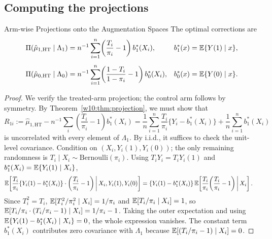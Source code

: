 \documentclass[master.tex]{subfiles}
\begin{document}
\subsection{Computing the projections}
\label{w10:subsec:proj-compute}

\begin{thm}{Arm-wise Projections onto the Augmentation Spaces}
\label{w10:thm:proj-causal}
The optimal corrections are
\begin{align}
  \Pi(\hat\mu_{1,\mathrm{HT}} \mid \Lambda_1)
  &= n^{-1}\sum_{i=1}^n
     \!\left(\frac{T_i}{\pi_i}-1\right) b_1^*(X_i),
  &b_1^*(x) &= \mathbb{E}\{Y(1)\mid x\},
  \label{w10:eq:proj-causal-1} \\[4pt]
  \Pi(\hat\mu_{0,\mathrm{HT}} \mid \Lambda_0)
  &= n^{-1}\sum_{i=1}^n
     \!\left(\frac{1-T_i}{1-\pi_i}-1\right) b_0^*(X_i),
  &b_0^*(x) &= \mathbb{E}\{Y(0)\mid x\}.
  \label{w10:eq:proj-causal-0}
\end{align}
\end{thm}

\begin{proof}
We verify the treated-arm projection; the control arm follows by
symmetry.  By Theorem~\ref{w10:thm:projection}, we must show that
\[
  R_{1i}
  := \hat\mu_{1,\mathrm{HT}} - n^{-1}\!\sum_i
     \!\left(\frac{T_i}{\pi_i}-1\right)b_1^*(X_i)
   = \frac{1}{n}\sum_{i=1}^n \frac{T_i}{\pi_i}\{Y_i - b_1^*(X_i)\}
     + \frac{1}{n}\sum_{i=1}^n b_1^*(X_i)
\]
is uncorrelated with every element of $\Lambda_1$.  By i.i.d., it
suffices to check the unit-level covariance.  Condition on
$(X_i, Y_i(1), Y_i(0))$; the only remaining randomness is
$T_i \mid X_i \sim \mathrm{Bernoulli}(\pi_i)$.  Using
$T_i Y_i = T_i Y_i(1)$ and $b_1^*(X_i) = \mathbb{E}\{Y_i(1)\mid X_i\}$,
\begin{align*}
  \mathbb{E}\!\left[
    \frac{T_i}{\pi_i}\{Y_i(1) - b_1^*(X_i)\}
    \cdot
    \left(\frac{T_i}{\pi_i}-1\right)
  \,\middle|\, X_i, Y_i(1), Y_i(0)
  \right]
  &=
  \{Y_i(1)-b_1^*(X_i)\}
  \,\mathbb{E}\!\left[
    \frac{T_i}{\pi_i}\!\left(\frac{T_i}{\pi_i}-1\right)
  \,\middle|\, X_i
  \right].
\end{align*}
Since $T_i^2 = T_i$,
$\mathbb{E}[T_i^2/\pi_i^2 \mid X_i] = 1/\pi_i$
and
$\mathbb{E}[T_i/\pi_i \mid X_i] = 1$, so
$\mathbb{E}[T_i/\pi_i\cdot(T_i/\pi_i - 1)\mid X_i]
 = 1/\pi_i - 1$.
Taking the outer expectation and using
$\mathbb{E}\{Y_i(1)-b_1^*(X_i)\mid X_i\} = 0$,
the whole expression vanishes.  The constant term $b_1^*(X_i)$
contributes zero covariance with $\Lambda_1$ because
$\mathbb{E}[(T_i/\pi_i - 1)\mid X_i] = 0$.
\end{proof}
\end{document}

